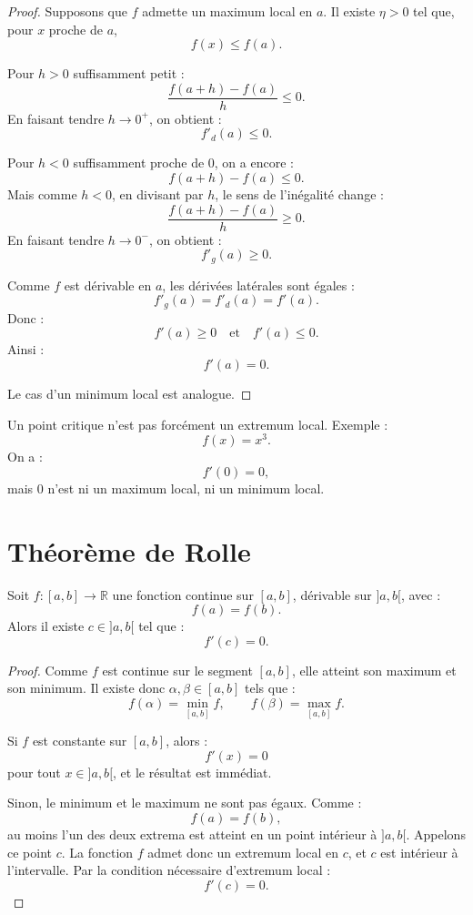 \documentclass[11pt,a4paper]{article}
\newcommand{\R}{\mathbb R}
\begin{document}
\begin{proof}
Supposons que \(f\) admette un maximum local en \(a\).  
Il existe \(\eta>0\) tel que, pour \(x\) proche de \(a\),
\[
f(x)\leq f(a).
\]

Pour \(h>0\) suffisamment petit :
\[
\frac{f(a+h)-f(a)}{h}\leq0.
\]
En faisant tendre \(h\to0^+\), on obtient :
\[
f'_d(a)\leq0.
\]

Pour \(h<0\) suffisamment proche de \(0\), on a encore :
\[
f(a+h)-f(a)\leq0.
\]
Mais comme \(h<0\), en divisant par \(h\), le sens de l'inégalité change :
\[
\frac{f(a+h)-f(a)}{h}\geq0.
\]
En faisant tendre \(h\to0^-\), on obtient :
\[
f'_g(a)\geq0.
\]

Comme \(f\) est dérivable en \(a\), les dérivées latérales sont égales :
\[
f'_g(a)=f'_d(a)=f'(a).
\]
Donc :
\[
f'(a)\geq0
\quad\text{et}\quad
f'(a)\leq0.
\]
Ainsi :
\[
f'(a)=0.
\]

Le cas d'un minimum local est analogue.
\end{proof}

\begin{erreurbox}
Un point critique n'est pas forcément un extremum local.  
Exemple :
\[
f(x)=x^3.
\]
On a :
\[
f'(0)=0,
\]
mais \(0\) n'est ni un maximum local, ni un minimum local.
\end{erreurbox}

\section{Théorème de Rolle}

\begin{theorembox}
Soit \(f:[a,b]\to\R\) une fonction continue sur \([a,b]\), dérivable sur \(]a,b[\), avec :
\[
f(a)=f(b).
\]
Alors il existe \(c\in]a,b[\) tel que :
\[
f'(c)=0.
\]
\end{theorembox}

\begin{proof}
Comme \(f\) est continue sur le segment \([a,b]\), elle atteint son maximum et son minimum.  
Il existe donc \(\alpha,\beta\in[a,b]\) tels que :
\[
f(\alpha)=\min_{[a,b]}f,
\qquad
f(\beta)=\max_{[a,b]}f.
\]

Si \(f\) est constante sur \([a,b]\), alors :
\[
f'(x)=0
\]
pour tout \(x\in]a,b[\), et le résultat est immédiat.

Sinon, le minimum et le maximum ne sont pas égaux.  
Comme :
\[
f(a)=f(b),
\]
au moins l'un des deux extrema est atteint en un point intérieur à \(]a,b[\).  
Appelons ce point \(c\).  
La fonction \(f\) admet donc un extremum local en \(c\), et \(c\) est intérieur à l'intervalle.  
Par la condition nécessaire d'extremum local :
\[
f'(c)=0.
\]
\end{proof}
\end{document}
